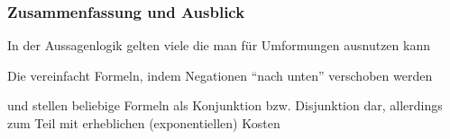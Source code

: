 \documentclass[aspectratio=1610,onlymath]{beamer}
\begin{document}
\begin{frame}\frametitle{Zusammenfassung und Ausblick}

In der Aussagenlogik gelten viele  die man für Umformungen ausnutzen kann
\bigskip

Die  vereinfacht Formeln, indem Negationen "`nach unten"' verschoben werden
\bigskip

 und  stellen beliebige Formeln als Konjunktion bzw. Disjunktion dar, allerdings zum Teil mit erheblichen (exponentiellen) Kosten\bigskip


\end{frame}
\end{document}
